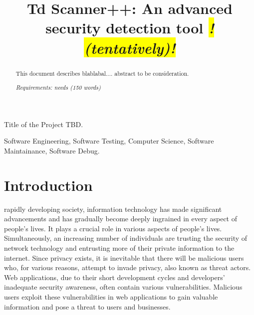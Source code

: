 \documentclass[journal]{IEEEtran}
\begin{document}
\title{%
Td Scanner++: An advanced security detection tool
\colorbox{yellow}{\textit{! (tentatively)!}}
}





%
{Title of the Project TBD.}

\maketitle

\begin{abstract}
This document describes blablabal....
abstract to be consideration.

\textit{Requirements: needs (150 words) }

\end{abstract}

\begin{IEEEkeywords}
Software Engineering, Software Testing, Computer Science, Software Maintainance, Software Debug.
\end{IEEEkeywords}


\section{Introduction}
 rapidly developing society, information technology has made significant advancements and has gradually become deeply ingrained in every aspect of people's lives. It plays a crucial role in various aspects of people's lives. Simultaneously, an increasing number of individuals are trusting the security of network technology and entrusting more of their private information to the internet. Since privacy exists, it is inevitable that there will be malicious users who, for various reasons, attempt to invade privacy, also known as threat actors. Web applications, due to their short development cycles and developers' inadequate security awareness, often contain various vulnerabilities. Malicious users exploit these vulnerabilities in web applications to gain valuable information and pose a threat to users and businesses.
\end{document}
